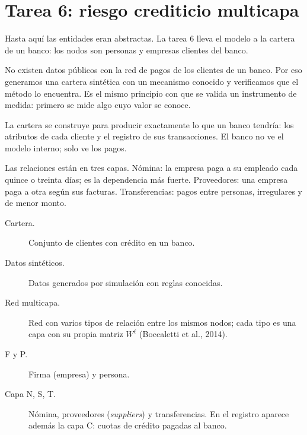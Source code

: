 \section{Tarea 6: riesgo crediticio multicapa}

\begin{decir}
Hasta aquí las entidades eran abstractas. La tarea 6 lleva el modelo a la cartera de un
banco: los nodos son personas y empresas clientes del banco.

No existen datos públicos con la red de pagos de los clientes de un banco. Por eso
generamos una cartera sintética con un mecanismo conocido y verificamos que el método lo
encuentra. Es el mismo principio con que se valida un instrumento de medida: primero se
mide algo cuyo valor se conoce.

La cartera se construye para producir exactamente lo que un banco tendría: los atributos
de cada cliente y el registro de sus transacciones. El banco no ve el modelo interno; solo
ve los pagos.

Las relaciones están en tres capas. Nómina: la empresa paga a su empleado cada quince o
treinta días; es la dependencia más fuerte. Proveedores: una empresa paga a otra según
sus facturas. Transferencias: pagos entre personas, irregulares y de menor monto.
\end{decir}
\begin{terminos}
\begin{description}
\item[Cartera.] Conjunto de clientes con crédito en un banco.
\item[Datos sintéticos.] Datos generados por simulación con reglas conocidas.
\item[Red multicapa.] Red con varios tipos de relación entre los mismos nodos; cada tipo
es una capa con su propia matriz $W^\ell$ (Boccaletti et al., 2014).
\item[F y P.] Firma (empresa) y persona.
\item[Capa N, S, T.] Nómina, proveedores (\emph{suppliers}) y transferencias. En el
registro aparece además la capa C: cuotas de crédito pagadas al banco.
\end{description}
\end{terminos}
\begin{preguntas}
\end{preguntas}

